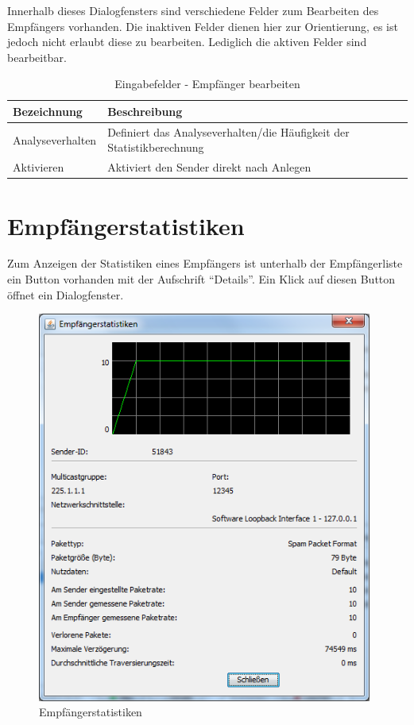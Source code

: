 Innerhalb dieses Dialogfensters sind verschiedene Felder zum Bearbeiten des
Empfängers vorhanden. Die inaktiven Felder dienen hier zur Orientierung, es ist
jedoch nicht erlaubt diese zu bearbeiten. Lediglich die aktiven Felder sind
bearbeitbar.

\begin{table}[h]
\caption{Eingabefelder - Empfänger bearbeiten}
\label{tab:inputEditReceiver}
\begin{center}
\begin{tabular}{|l|p{10cm}|}
\hline
\textbf{Bezeichnung} & \textbf{Beschreibung}\\
\hline
Analyseverhalten & Definiert das Analyseverhalten/die Häufigkeit der
Statistikberechnung\\
\hline
 Aktivieren & Aktiviert den Sender direkt nach Anlegen\\
\hline
\end{tabular}
\end{center}
\label{default}
\end{table}

\chapter{Empfängerstatistiken}
Zum Anzeigen der Statistiken eines Empfängers ist unterhalb der Empfängerliste
ein Button vorhanden mit der Aufschrift ``Details''. Ein Klick auf diesen Button
öffnet ein Dialogfenster.

\begin{figure}[htbp]
\begin{center}
\includegraphics[width=11cm]{images/showEmpfaenger.png}
\caption[Empfängerstatistiken]{Empfängerstatistiken}
\label{receiverstatistics}
\end{center}
\end{figure}

